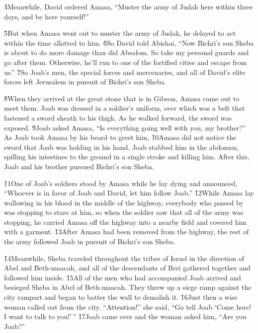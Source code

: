 \v{4}Meanwhile, David ordered Amasa, ``Muster the army of Judah here within three days, and be here yourself!''

\v{5}But when Amasa went out to muster the army of Judah, he delayed to act within the time allotted to him. \v{6}So David told Abishai, ``Now Bichri's son Sheba is about to do more damage than did Absalom. So take my personal guards and go after them. Otherwise, he'll run to one of the fortified cities and escape from us.'' \v{7}So Joab's men, the special forces and mercenaries, and all of David's elite forces left Jerusalem in pursuit of Bichri's son Sheba.

\v{8}When they arrived at the great stone that is in Gibeon, Amasa came out to meet them. Joab was dressed in a soldier's uniform, over which was a belt that fastened a sword sheath to his thigh. As he walked forward, the sword was exposed. \v{9}Joab asked Amasa, ``Is everything going well with you, my brother?'' As Joab took Amasa by his beard to greet him, \v{10}Amasa did not notice the sword that Joab was holding in his hand. Joab stabbed him in the abdomen, spilling his intestines to the ground in a single stroke and killing him. After this, Joab and his brother pursued Bichri's son Sheba.

\v{11}One of Joab's soldiers stood by Amasa while he lay dying and announced, ``Whoever is in favor of Joab and David, let him follow Joab.'' \v{12}While Amasa lay wallowing in his blood in the middle of the highway, everybody who passed by was stopping to stare at him, so when the soldier saw that all of the army was stopping, he carried Amasa off the highway into a nearby field and covered him with a garment. \v{13}After Amasa had been removed from the highway, the rest of the army followed Joab in pursuit of Bichri's son Sheba.

\v{14}Meanwhile, Sheba traveled throughout the tribes of Israel in the direction of Abel and Beth-maacah, and all of the descendants of Beri gathered together and followed him inside. \v{15}All of the men who had accompanied Joab arrived and besieged Sheba in Abel of Beth-maacah. They threw up a siege ramp against the city rampart and began to batter the wall to demolish it. \v{16}Just then a wise woman called out from the city. ``Attention!'' she said, ``Go tell Joab `Come here! I want to talk to you!'\,'' \v{17}Joab came over and the woman asked him, ``Are you Joab?''

